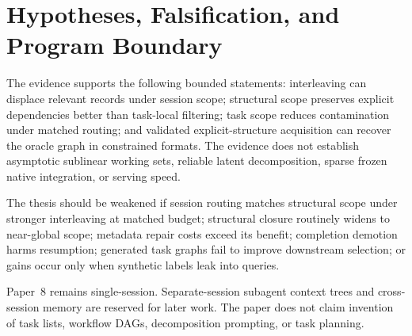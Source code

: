 \documentclass[10pt]{article}
\begin{document}
\section{Hypotheses, Falsification, and Program Boundary}
The evidence supports the following bounded statements: interleaving can displace relevant records under session scope; structural scope preserves explicit dependencies better than task-local filtering; task scope reduces contamination under matched routing; and validated explicit-structure acquisition can recover the oracle graph in constrained formats. The evidence does not establish asymptotic sublinear working sets, reliable latent decomposition, sparse frozen native integration, or serving speed.

The thesis should be weakened if session routing matches structural scope under stronger interleaving at matched budget; structural closure routinely widens to near-global scope; metadata repair costs exceed its benefit; completion demotion harms resumption; generated task graphs fail to improve downstream selection; or gains occur only when synthetic labels leak into queries.

Paper~8 remains single-session. Separate-session subagent context trees and cross-session memory are reserved for later work. The paper does not claim invention of task lists, workflow DAGs, decomposition prompting, or task planning.
\end{document}
